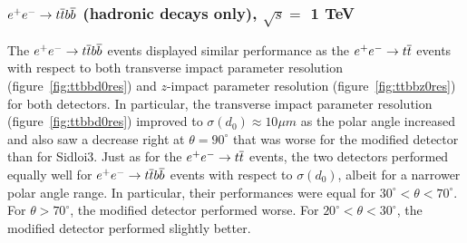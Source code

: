 \subsubsection{$\ee \rightarrow \ttbar \bbbar$ (hadronic decays only), $ \sqrt{s} = $ 1 TeV}
The $\ee \rightarrow \ttbar \bbbar$ events displayed similar performance as  the $\ee \rightarrow \ttbar$ events
 with respect to both transverse impact parameter resolution (figure~\ref{fig:ttbbd0res}) and 
$z$-impact parameter resolution (figure~\ref{fig:ttbbz0res}) for both detectors.
In particular, the transverse impact parameter resolution (figure~\ref{fig:ttbbd0res}) improved to $\sigma(d_{0}) \approx 10 \mu m$
as the polar angle increased and also saw a decrease right at $\theta =  90^{\circ}$ that was worse for
the modified detector than for Sidloi3.
Just as for the $\ee \rightarrow \ttbar$ events, 
the two detectors performed equally well for $\ee \rightarrow \ttbar \bbbar$ events
with respect to $\sigma(d_{0})$, albeit for a narrower polar angle range.
In particular, their performances were equal for $30^{\circ} < \theta < 70^{\circ}$.
For $\theta > 70^{\circ}$, the modified detector performed worse.
For $20^{\circ} < \theta < 30^{\circ}$, the modified detector performed slightly better.
